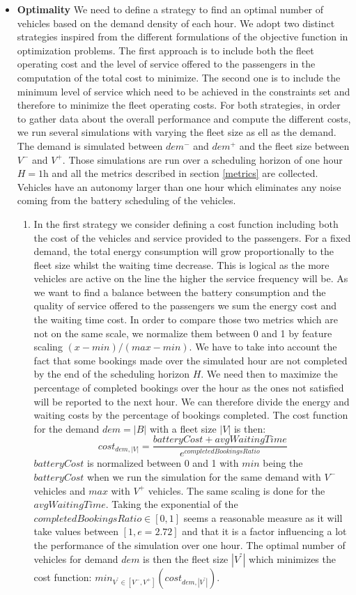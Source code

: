 \documentclass[12pt,a4paper]{article}
\begin{document}
\begin{itemize}
\item \textbf{Optimality} We need to define a strategy to find an optimal number of vehicles based on the demand density of each hour. We adopt two distinct strategies inspired from the different formulations of the objective function in optimization problems. The first approach is to include both the fleet operating cost and the level of service offered to the passengers in the computation of the total cost to minimize. The second one is to include the minimum level of service which need to be achieved in the constraints set and therefore to minimize the fleet operating costs. For both strategies, in order to gather data about the overall performance and compute the different costs, we run several simulations with varying the fleet size as ell as the demand. The demand is simulated between $dem^{-}$ and $dem^{+}$ and the fleet size between $V^{-}$ and $V^{+}$. Those simulations are run over a scheduling horizon of one hour $H = 1$h and all the metrics described in section \ref{metrics} are collected. Vehicles have an autonomy larger than one hour which eliminates any noise coming from the battery scheduling of the vehicles. 
\begin{enumerate}
\setlength\itemsep{1pt} 
\item In the first strategy we consider defining a cost function including both the cost of the vehicles and service provided to the passengers. For a fixed demand, the total energy consumption will grow proportionally to the fleet size whilst the waiting time decrease. This is logical as the more vehicles are active on the line the higher the service frequency will be. As we want to find a balance between the battery consumption and the quality of service offered to the passengers we sum the energy cost and the waiting time cost. In order to compare those two metrics which are not on the same scale, we normalize them between 0 and 1 by feature scaling $(x-min)/(max-min)$. We have to take into account the fact that some bookings made over the simulated hour are not completed by the end of the scheduling horizon $H$. We need then to maximize the percentage of completed bookings over the hour as the ones not satisfied will be reported to the next hour. We can therefore divide the energy and waiting costs by the percentage of bookings completed. The cost function for the demand $dem = |B|$ with a fleet size $|V|$ is then:
$$ cost_{dem, |V|} = \frac{batteryCost + avgWaitingTime}{e^{completedBookingsRatio}}$$
$batteryCost$ is normalized between 0 and 1 with $min$ being the $batteryCost$ when we run the simulation for the same demand with $V^{-}$ vehicles and $max$ with $V^{+}$ vehicles. The same scaling is done for the $avgWaitingTime$. Taking the exponential of the $completedBookingsRatio \in [0,1]$ seems a reasonable measure as it will take values between $[1, e = 2.72]$ and that it is a factor influencing a lot the performance of the simulation over one hour. The optimal number of vehicles for demand $dem$ is then the fleet size $|V^{°}|$ which minimizes the cost function: $min_{V^{°}\in[V^{-}, V^{+}]} (cost_{dem, |V^{°}|})$.

\end{enumerate}
\end{itemize}
\end{document}
